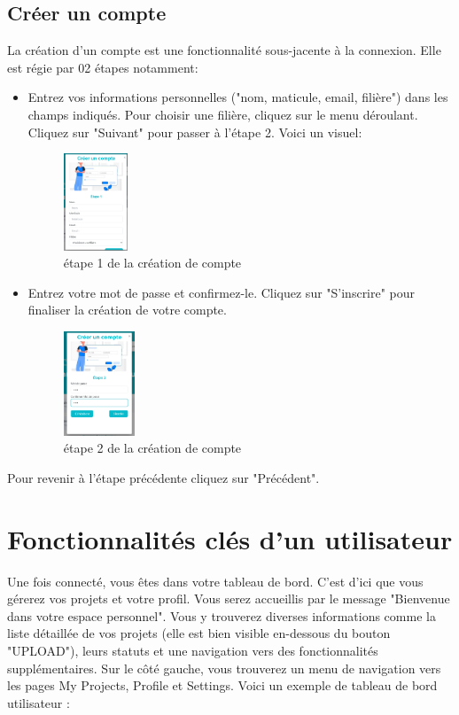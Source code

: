 \documentclass[12pt]{article}
\begin{document}
\subsection{Créer un compte}
La création d'un compte est une fonctionnalité sous-jacente à la connexion. Elle est régie par 02 étapes notamment:
\begin{itemize}
    \item Entrez vos informations personnelles ("nom, maticule, email, filière") dans les champs indiqués. Pour choisir une filière, cliquez sur le menu déroulant. Cliquez sur "Suivant" pour passer à l'étape 2. Voici un visuel:
            \begin{figure}[h!]
                \centering
                \includegraphics[width=0.18\textwidth]{./images/creercompte1.png}
                \caption{étape 1 de la création de compte}
                \label{fig:étape 1 de la création de compte}
            \end{figure}
        \medskip       
    \item Entrez votre mot de passe et confirmez-le. Cliquez sur "S'inscrire" pour finaliser la création de votre compte.
            \begin{figure}[h!]
                \centering
                \includegraphics[width=0.2\textwidth]{images/creercompte2.png}
                \caption{étape 2 de la création de compte}
                \label{fig:etape2}
            \end{figure}
\end{itemize}
Pour revenir à l'étape précédente cliquez sur "Précédent".

\bigskip
\section{Fonctionnalités clés d'un utilisateur}
Une fois connecté, vous êtes dans votre tableau de bord. C'est d'ici que vous gérerez vos projets et votre profil. Vous serez accueillis par le message "Bienvenue dans votre espace personnel". Vous y trouverez diverses informations comme la liste détaillée de vos projets (elle est bien visible en-dessous du bouton "UPLOAD"), leurs statuts et une navigation vers des fonctionnalités supplémentaires. Sur le côté gauche, vous trouverez un menu de navigation vers les pages My Projects, Profile et Settings. Voici un exemple de tableau de bord utilisateur :
\end{document}
